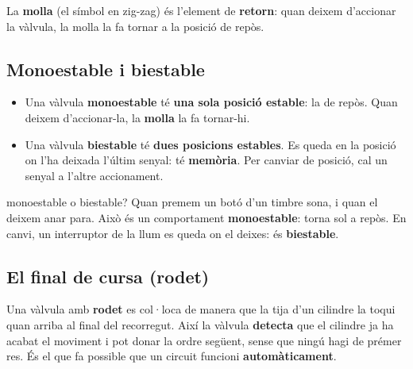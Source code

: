 La \textbf{molla} (el símbol en zig-zag) és l'element de \textbf{retorn}: quan deixem d'accionar la vàlvula, la molla la fa tornar a la posició de repòs.

\subsection*{Monoestable i biestable}

\begin{center}
\end{center}

\begin{idea}
\begin{itemize}
 \item Una vàlvula \textbf{monoestable} té \textbf{una sola posició estable}: la de repòs. Quan deixem d'accionar-la, la \textbf{molla} la fa tornar-hi.
 \item Una vàlvula \textbf{biestable} té \textbf{dues posicions estables}. Es queda en la posició on l'ha deixada l'últim senyal: té \textbf{memòria}. Per canviar de posició, cal un senyal a l'altre accionament.
\end{itemize}
\end{idea}

\begin{exemple}{monoestable o biestable?}
Quan premem un botó d'un timbre sona, i quan el deixem anar para. Això és un comportament \textbf{monoestable}: torna sol a repòs. En canvi, un interruptor de la llum es queda on el deixes: és \textbf{biestable}.
\end{exemple}

\subsection*{El final de cursa (rodet)}

Una vàlvula amb \textbf{rodet} es col·loca de manera que la tija d'un cilindre la toqui quan arriba al final del recorregut. Així la vàlvula \textbf{detecta} que el cilindre ja ha acabat el moviment i pot donar la ordre següent, sense que ningú hagi de prémer res. És el que fa possible que un circuit funcioni \textbf{automàticament}.


